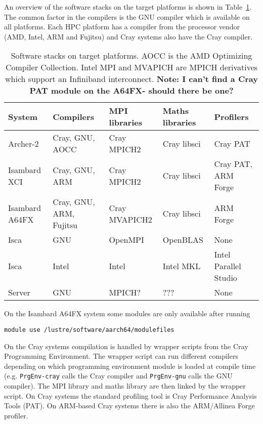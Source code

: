 \documentclass[a4paper,titlepage]{article}
\begin{document}
An overview of the software stacks on the target platforms is shown in Table~\ref{tab:software}. 
The common factor in the compilers is the GNU compiler which is available on all platforms. Each HPC platform has a compiler from the processor vendor (AMD, Intel, ARM and Fujitsu) and Cray systems also have the Cray compiler.
\begin{table}[htp]
\begin{center}
\begin{tabular}{|l|l|l|l|l|}
\hline 
System         & Compilers               & MPI libraries  & Maths libraries & Profilers            \\
\hline
Archer-2       & Cray, GNU, AOCC         & Cray MPICH2     & Cray libsci     & Cray PAT             \\
Isambard XCI   & Cray, GNU, ARM          & Cray MPICH2     & Cray libsci     & Cray PAT, ARM Forge  \\
Isambard A64FX & Cray, GNU, ARM, Fujitsu & Cray MVAPICH2   & Cray libsci     & ARM Forge            \\
Isca           & GNU                     & OpenMPI         & OpenBLAS        & None                  \\
Isca           & Intel                   & Intel           & Intel MKL       & Intel Parallel Studio \\
Server         & GNU                     & MPICH?          & ???             & None                  \\
\hline
\end{tabular}
\end{center}
\caption{Software stacks on target platforms. AOCC is the AMD Optimizing Compiler Collection. Intel MPI and MVAPICH are MPICH derivatives which support an Infiniband interconnect.
\textbf{Note: I can't find a Cray PAT module on the A64FX- should there be one?}}
\label{tab:software}
\end{table}
On the Isambard A64FX system some modules are only available after running 
\begin{verbatim}
module use /lustre/software/aarch64/modulefiles
\end{verbatim}

On the Cray systems compilation is handled by wrapper scripts from the Cray Programming Environment. The wrapper script can run different compilers depending on which programming environment module is loaded at compile time (e.g. \texttt{PrgEnv-cray} calls the Cray compiler and \texttt{PrgEnv-gnu} calls the GNU compiler). The MPI library and maths library are then linked by the wrapper script. On Cray systems the standard profiling tool is Cray Performance Analysis Tools (PAT). On ARM-based Cray systems there is also the ARM/Allinea Forge profiler.
\end{document}
